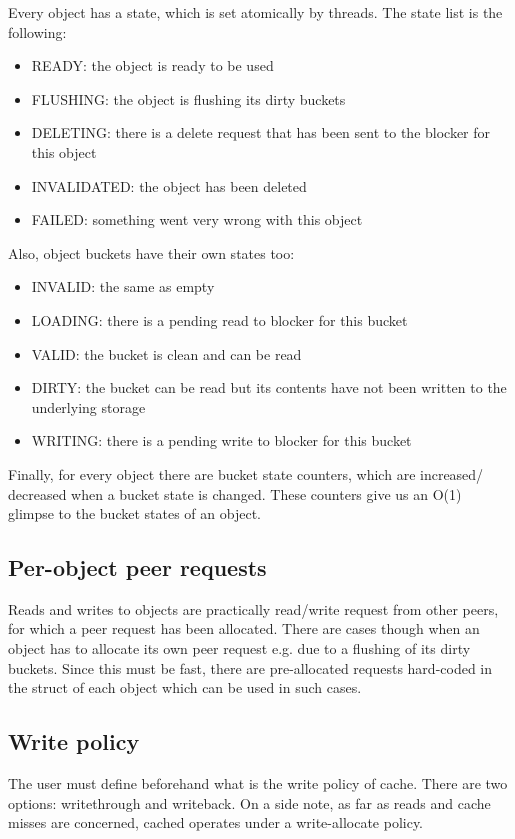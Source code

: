 Every object has a state, which is set atomically by threads. The state list is
the following:

\begin{itemize}
	\item READY: the object is ready to be used
	\item FLUSHING: the object is flushing its dirty buckets
	\item DELETING: there is a delete request that has been sent to the 
		blocker for this object
	\item INVALIDATED: the object has been deleted
	\item FAILED: something went very wrong with this object
\end{itemize}

Also, object buckets have their own states too:

\begin{itemize}
	\item INVALID: the same as empty
	\item LOADING: there is a pending read to blocker for this bucket
	\item VALID: the bucket is clean and can be read
	\item DIRTY: the bucket can be read but its contents have not been
		written to the underlying storage
	\item WRITING: there is a pending write to blocker for this bucket
\end{itemize}

Finally, for every object there are bucket state counters, which are increased/
decreased when a bucket state is changed. These counters give us an O(1)
glimpse to the bucket states of an object.

\subsection{Per-object peer requests}

Reads and writes to objects are practically read/write request from other
peers, for which a peer request has been allocated. There are cases though
when an object has to allocate its own peer request e.g. due to a flushing of
its dirty buckets. Since this must be fast, there are pre-allocated requests
hard-coded in the struct of each object which can be used in such cases.

\subsection{Write policy}

The user must define beforehand what is the write policy of cache. There are
two options: writethrough and writeback. On a side note, as far as reads and
cache misses are concerned, cached operates under a write-allocate policy.

